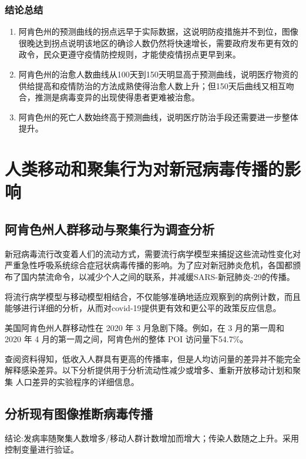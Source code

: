 \documentclass[withoutpreface,bwprint]{cumcmthesis} %
\begin{document}
\subsubsection{结论总结}
\begin{enumerate}
    \item 阿肯色州的预测曲线的拐点远早于实际数据，这说明防疫措施并不到位，图像很晚达到拐点说明该地区的确诊人数仍然将快速增长，需要政府发布更有效的政令，民众更遵守疫情防控规则，才能使疫情拐点更早到来。
    \item 阿肯色州的治愈人数曲线从100天到150天明显高于预测曲线，说明医疗物资的供给提高和疫情防治的方法成熟使得治愈人数上升；但150天后曲线又相互吻合，推测是病毒变异的出现使得患者更难被治愈。
    \item 阿肯色州的死亡人数始终高于预测曲线，说明医疗防治手段还需要进一步整体提升。
\end{enumerate}

\clearpage
\section{人类移动和聚集行为对新冠病毒传播的影响}
\subsection{阿肯色州人群移动与聚集行为调查分析}
新冠病毒流行改变着人们的流动方式，需要流行病学模型来捕捉这些流动性变化对严重急性呼吸系统综合症冠状病毒传播的影响。为了应对新冠肺炎危机，各国都颁布了国内禁流命令，以减少个人之间的联系，并减缓SARS-新冠肺炎-29的传播。

将流行病学模型与移动模型相结合，不仅能够准确地适应观察到的病例计数，而且能够进行详细的分析，从而对covid-19提供更有效和更公平的政策反应信息。

美国阿肯色州人群移动性在 2020 年 3 月急剧下降。例如，在 3 月的第一周和
2020 年 4 月的第一周之间，阿肯色州的整体 POI 访问量下54.7\%。

查阅资料得知，低收入人群具有更高的传播率，但是人均访问量的差异并不能完全解释感染差异。以下分析提供用于分析流动性减少或增多、重新开放移动计划和聚集
人口差异的实验程序的详细信息。

\subsection{分析现有图像推断病毒传播}
结论:发病率随聚集人数增多/移动人群计数增加而增大；传染人数随之上升。采用控制变量进行验证。
\end{document}

